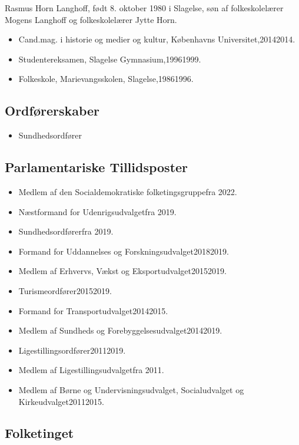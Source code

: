 \documentclass[11pt, a4paper]{awesome-cv}
\begin{document}
\makecvheader[R]
\makelettertitle
\begin{cvletter}
Rasmus Horn Langhoff, født 8. oktober 1980 i Slagelse, søn af folkeskolelærer Mogens Langhoff og folkeskolelærer Jytte Horn.

\begin{itemize}
\item Cand.mag. i historie og medier og kultur, Københavns Universitet,20142014.
\item Studentereksamen, Slagelse Gymnasium,19961999.
\item Folkeskole, Marievangsskolen, Slagelse,19861996.
\end{itemize}
\subsection*{Ordførerskaber}
\begin{itemize}
\item Sundhedsordfører
\end{itemize}
\subsection*{Parlamentariske Tillidsposter}
\begin{itemize}
\item Medlem af den Socialdemokratiske folketingsgruppefra 2022.
\item Næstformand for Udenrigsudvalgetfra 2019.
\item Sundhedsordførerfra 2019.
\item Formand for Uddannelses og Forskningsudvalget20182019.
\item Medlem af Erhvervs, Vækst og Eksportudvalget20152019.
\item Turismeordfører20152019.
\item Formand for Transportudvalget20142015.
\item Medlem af Sundheds og Forebyggelsesudvalget20142019.
\item Ligestillingsordfører20112019.
\item Medlem af Ligestillingsudvalgetfra 2011.
\item Medlem af Børne og Undervisningsudvalget, Socialudvalget og Kirkeudvalget20112015.
\end{itemize}
\subsection*{Folketinget}

\end{cvletter}
\end{document}
